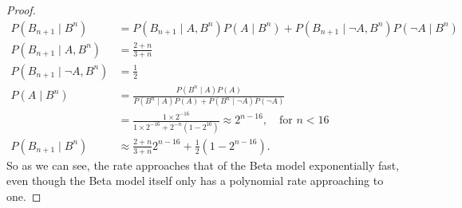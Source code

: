 \documentclass[twoside,a4paper]{article}
\begin{document}
\begin{proof}
  \begin{align*}
    P(B_{n+1} \mid B^n)
    &=  P(B_{n+1} \mid A, B^n) P(A \mid B^n) + P(B_{n+1} \mid \neg A, B^n) P(\neg A \mid B^n)\\
    P(B_{n+1} \mid A, B^n) &= \frac{2 + n}{3 + n}\\
    P(B_{n+1} \mid \neg A, B^n) &= \frac{1}{2}\\
    P(A \mid B^n)
    &=  \frac{P(B^n \mid A) P(A)}{P(B^n \mid A) P(A) + P(B^n \mid \neg A) P(\neg A)}\\
    &=  \frac{1 \times 2^{-16}}{1 \times 2^{-16} + 2^{-n}(1 - 2^{16})} \approx 2^{n-16}, \quad \textrm{for  $n <16$}\\
    P(B_{n+1} \mid B^n) &\approx \frac{2 + n}{3 + n} 2^{n - 16} + \frac{1}{2} (1 - 2^{n - 16}).
  \end{align*}
  So as we can see, the rate approaches that of the Beta model exponentially fast, even though the Beta model itself only has a polynomial rate approaching to one.
\end{proof}
\end{document}
